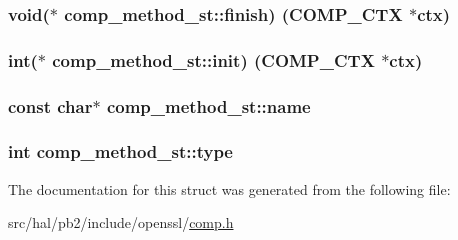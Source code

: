 \subsubsection[{\texorpdfstring{finish}{finish}}]{\setlength{\rightskip}{0pt plus 5cm}void($\ast$ comp\+\_\+method\+\_\+st\+::finish) ({\bf C\+O\+M\+P\+\_\+\+C\+TX} $\ast$ctx)}\hypertarget{structcomp__method__st_af6a0a033a48d84fad2cfd6776f4c2dfc}{}\label{structcomp__method__st_af6a0a033a48d84fad2cfd6776f4c2dfc}
\subsubsection[{\texorpdfstring{init}{init}}]{\setlength{\rightskip}{0pt plus 5cm}int($\ast$ comp\+\_\+method\+\_\+st\+::init) ({\bf C\+O\+M\+P\+\_\+\+C\+TX} $\ast$ctx)}\hypertarget{structcomp__method__st_af175cb97f5906c4298b88c65507a8a64}{}\label{structcomp__method__st_af175cb97f5906c4298b88c65507a8a64}
\subsubsection[{\texorpdfstring{name}{name}}]{\setlength{\rightskip}{0pt plus 5cm}const char$\ast$ comp\+\_\+method\+\_\+st\+::name}\hypertarget{structcomp__method__st_a2331b9bae2f1539bab8e75efc58283b1}{}\label{structcomp__method__st_a2331b9bae2f1539bab8e75efc58283b1}
\subsubsection[{\texorpdfstring{type}{type}}]{\setlength{\rightskip}{0pt plus 5cm}int comp\+\_\+method\+\_\+st\+::type}\hypertarget{structcomp__method__st_a398382b23088b56dc05184016dfe247c}{}\label{structcomp__method__st_a398382b23088b56dc05184016dfe247c}


The documentation for this struct was generated from the following file\+:\begin{DoxyCompactItemize}
\item 
src/hal/pb2/include/openssl/\hyperlink{comp_8h}{comp.\+h}\end{DoxyCompactItemize}
